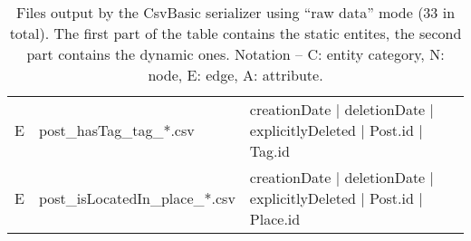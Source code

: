 \begin{table}[htb]
\begin{tabular}{|c|l|l|}
        E                    & post\_hasTag\_tag\_*.csv                & creationDate | deletionDate | explicitlyDeleted | Post.id | Tag.id                                                                   \\
        E                    & post\_isLocatedIn\_place\_*.csv         & creationDate | deletionDate | explicitlyDeleted | Post.id | Place.id                                                                 \\
        \hline
    \end{tabular}
    \caption{Files output by the CsvBasic serializer using ``raw data'' mode (33 in total). The first part of the table contains the static entites, the second part contains the dynamic ones. Notation -- C: entity category, N: node, E: edge, A: attribute.}
    \label{table:csv_basic_rawdata}
\end{table}
